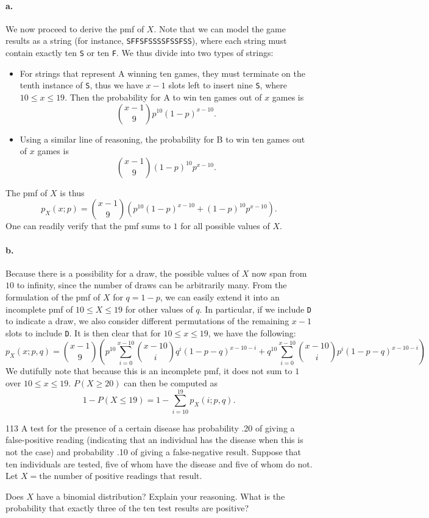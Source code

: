\documentclass{exam}
\newcommand{\paren}[1]{\left(#1\right)}
\begin{document}
\paragraph{a.} We now proceed to derive the pmf of $X$. Note that we can model the game results as a string (for instance, \verb|SFFSFSSSSFSSFSS|), where each string must contain exactly ten \verb|S| or ten \verb|F|. We thus divide into two types of strings:
\begin{itemize}
	\item For strings that represent A winning ten games, they must terminate on the tenth instance of \verb|S|, thus we have $x - 1$ slots left to insert nine \verb|S|, where $10 \le x \le 19$. Then the probability for A to win ten games out of $x$ games is
	\[
		\binom{x - 1}{9}p^{10}(1 - p)^{x - 10}.
	\]
	\item Using a similar line of reasoning, the probability for B to win ten games out of $x$ games is
	\[
		\binom{x - 1}{9}(1 - p)^{10}p^{x - 10}.
	\]
\end{itemize}
The pmf of $X$ is thus
\[
	p_X(x; p) = \binom{x - 1}{9}(p^{10}(1 - p)^{x - 10} + (1 - p)^{10}p^{x - 10}).
\]
One can readily verify that the pmf sums to $1$ for all possible values of $X$.

\paragraph{b.} Because there is a possibility for a draw, the possible values of $X$ now span from $10$ to infinity, since the number of draws can be arbitrarily many. From the formulation of the pmf of $X$ for $q = 1 - p$, we can easily extend it into an incomplete pmf of $10 \le X \le 19$ for other values of $q$. In particular, if we include \verb|D| to indicate a draw, we also consider different permutations of the remaining $x - 1$ slots to include \verb|D|. It is then clear that for $10 \le x \le 19$, we have the following:
\[
	p_X(x; p, q) = \binom{x - 1}{9} \paren{p^{10}\sum_{i = 0}^{x - 10}\binom{x - 10}i q^i (1 - p - q)^{x - 10 - i} + q^{10}\sum_{i = 0}^{x - 10}\binom{x - 10}i p^i (1 - p - q)^{x - 10 - i}}
\]
We dutifully note that because this is an incomplete pmf, it does not sum to $1$ over $10 \le x \le 19$. $P(X \ge 20)$ can then be computed as
\[
	1 - P(X \le 19) = 1 - \sum_{i = 10}^{19} p_X(i; p, q).
\]

\begin{problem}{113}
	A test for the presence of a certain disease has probability .20 of giving a false-positive reading (indicating that an individual has the disease when this is not the case) and probability .10 of giving a false-negative result. Suppose that ten individuals are tested, five of whom have the disease and five of whom do not. Let $X = \text{the number of positive readings that result}$.
	\begin{tasks}[label=\textbf{\alph*.}]
		\task Does $X$ have a binomial distribution? Explain your reasoning.
		\task What is the probability that exactly three of the ten test results are positive?
	\end{tasks}
\end{problem}
\end{document}
